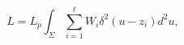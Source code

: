 \begin{equation}
L=L_p\int_\Sigma \sum_{i=1}^\ell W_i\delta ^2(u-z_i)d^2u,
\label{Lp}
\end{equation}


